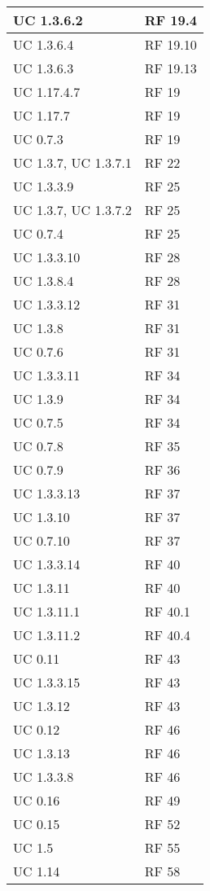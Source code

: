 {\begin{longtable} [c]{| p{4cm} | p{4cm} |}
 \hline 
UC 1.3.6.2 & RF 19.4\\ 
 \hline 
UC 1.3.6.4 & RF 19.10\\ 
 \hline 
UC 1.3.6.3 & RF 19.13\\ 
 \hline 
UC 1.17.4.7 & RF 19\\ 
 \hline 
UC 1.17.7 & RF 19\\ 
 \hline 
UC 0.7.3 & RF 19\\ 
 \hline 
UC 1.3.7, UC 1.3.7.1 & RF 22\\ 
 \hline 
UC 1.3.3.9 & RF 25\\ 
 \hline 
UC 1.3.7, UC 1.3.7.2 & RF 25\\ 
 \hline 
UC 0.7.4 & RF 25\\ 
 \hline 
UC 1.3.3.10 & RF 28\\ 
 \hline 
UC 1.3.8.4 & RF 28\\ 
 \hline 
UC 1.3.3.12 & RF 31\\ 
 \hline 
UC 1.3.8 & RF 31\\ 
 \hline 
UC 0.7.6 & RF 31\\ 
 \hline 
UC 1.3.3.11 & RF 34\\ 
 \hline 
UC 1.3.9 & RF 34\\ 
 \hline 
UC 0.7.5 & RF 34\\ 
 \hline 
UC 0.7.8 & RF 35\\ 
 \hline 
UC 0.7.9 & RF 36\\ 
 \hline 
UC 1.3.3.13 & RF 37\\ 
 \hline 
UC 1.3.10 & RF 37\\ 
 \hline 
UC 0.7.10 & RF 37\\ 
 \hline 
UC 1.3.3.14 & RF 40\\ 
 \hline 
UC 1.3.11 & RF 40\\ 
 \hline 
UC 1.3.11.1 & RF 40.1\\ 
 \hline 
UC 1.3.11.2 & RF 40.4\\ 
 \hline 
UC 0.11 & RF 43\\ 
 \hline 
UC 1.3.3.15 & RF 43\\ 
 \hline 
UC 1.3.12 & RF 43\\ 
 \hline 
UC 0.12 & RF 46\\ 
 \hline 
UC 1.3.13 & RF 46\\ 
 \hline 
UC 1.3.3.8 & RF 46\\ 
 \hline 
UC 0.16 & RF 49\\ 
 \hline 
UC 0.15 & RF 52\\ 
 \hline 
UC 1.5 & RF 55\\ 
 \hline 
UC 1.14 & RF 58\\ 

\end{longtable}}
